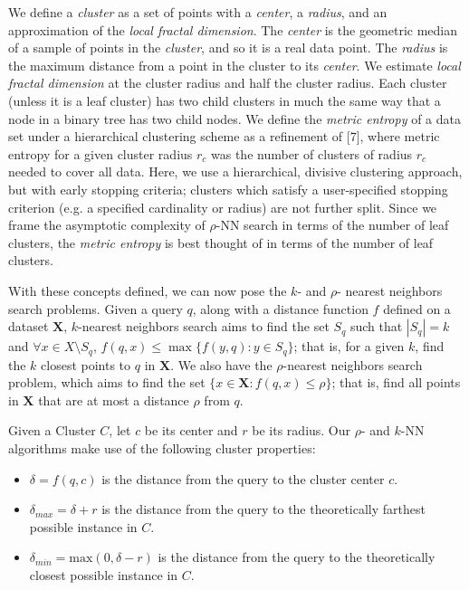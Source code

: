 We define a \emph{cluster} as a set of points with a \emph{center}, a \emph{radius}, and an approximation of the \emph{local fractal dimension}.
The \emph{center} is the geometric median of a sample of points in the \emph{cluster}, and so it is a real data point. The \emph{radius} is the
maximum distance from a point in the cluster to its \emph{center}. We estimate \emph{local fractal dimension} at the cluster radius and half
the cluster radius. Each cluster (unless it is a leaf cluster) has two child clusters in much the same way that a node in
a binary tree has two child nodes. We define the \emph{metric entropy} of a data set under a hierarchical clustering scheme as a refinement of [7], where
metric entropy for a given cluster radius $r_c$ was the number of clusters of radius $r_c$ needed to cover all data. Here, we use a hierarchical, divisive clustering 
approach, but with early stopping criteria; clusters which satisfy a user-specified stopping criterion (e.g. a specified cardinality or radius) are not further split. 
Since we frame the asymptotic complexity of $\rho$-NN search in terms of the number of leaf clusters, the \emph{metric entropy} is best thought of in terms of the number of
leaf clusters. 


With these concepts defined, we can now pose the $k$- and $\rho$- nearest neighbors search problems.
Given a query $q$, along with a distance function $f$ defined on a dataset $\textbf{X}$, $k$-nearest neighbors search aims to find 
the set $S_q$ such that  $|S_q| = k$ and $\forall x \in X \setminus S_q$, $f(q, x) \leq \max\{f(y, q): y \in S_q \}$; that is,
for a given $k$, find the $k$ closest points to $q$ in $ \textbf{X}$.
We also have the $\rho$-nearest neighbors search problem, which aims to find the set $\{x \in \textbf{X}: f(q, x) \leq \rho \}$; that is, 
find all points in $\textbf{X}$ that are at most a distance $\rho$ from $q$.

Given a Cluster $C$, let $c$ be its center and $r$ be its radius. Our $\rho$- and $k$-NN algorithms make use of the following cluster 
properties:
\begin{itemize}
    \item $\delta = f(q, c)$ is the distance from the query to the cluster center $c$.
    \item $\delta_{max} = \delta + r$ is the distance from the query to the theoretically farthest possible instance in $C$.
    \item $\delta_{min} = \text{max}(0, \delta - r)$ is the distance from the query to the theoretically closest possible instance in $C$.
\end{itemize}


